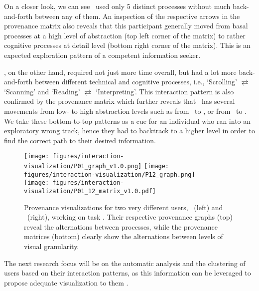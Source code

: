 On a closer look, we can see \PTwelve\ used only 5 distinct processes without much back-and-forth between any of them. 
%
An inspection of the respective arrows in the provenance matrix also reveals that this participant generally moved from basal processes at a high level of abstraction (top left corner of the matrix) to rather cognitive processes at detail level (bottom right corner of the matrix). 
%
This is an expected exploration pattern of a competent information seeker.


\POne, on the other hand, required not just more time overall, but had a lot more back-and-forth between different technical and cognitive processes, i.e., `Scrolling' $\rightleftarrows$ `Scanning' and `Reading' $\rightleftarrows$ `Interpreting'. 
%
This interaction pattern is also confirmed by the provenance matrix which further reveals that \POne\ has several movements from low- to high abstraction levels such as from \fullt\ to \wc, or from \wc\ to \toc. 
%
We take these bottom-to-top patterns as a cue for an individual who ran into an exploratory wrong track, hence they had to backtrack to a higher level in order to find the correct path to their desired information.


\begin{figure}[ht!]
    \centering
    \begin{minipage}{\mediumwidth\linewidth}
        \texttt{[image: figures/interaction-visualization/P01\_graph\_v1.0.png]} 
        \texttt{[image: figures/interaction-visualization/P12\_graph.png]} \\
        \texttt{[image: figures/interaction-visualization/P01\_12\_matrix\_v1.0.pdf]}
    \end{minipage}
    \caption{
    Provenance visualizations for two very different users, \POne\ (left) and \PTwelve\ (right), working on task \taskWcThree. 
    Their respective provenance graphs (top) reveal the alternations between processes, while the provenance matrices (bottom) clearly show the alternations between levels of visual granularity.
    }
    \label{fig:provenance-vis}
\end{figure}

The next research focus will be on the automatic analysis and the clustering of users based on their interaction patterns, as this information can be leveraged to propose adequate visualization to them \cite{gotz_behavior-driven_2009}. 




